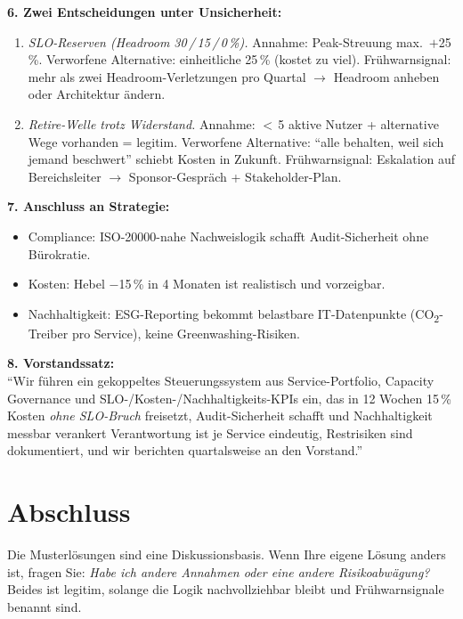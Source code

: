\documentclass[11pt,a4paper,oneside]{article}
\begin{document}
\begin{loesungbox}
\smallskip
\textbf{6. Zwei Entscheidungen unter Unsicherheit:}
\begin{enumerate}
  \item \emph{SLO-Reserven (Headroom 30\,/\,15\,/\,0\,\%).} Annahme: Peak-Streuung max.\ $+$25\,\%. Verworfene Alternative: einheitliche 25\,\% (kostet zu viel). Fr\"uhwarnsignal: mehr als zwei Headroom-Verletzungen pro Quartal $\rightarrow$ Headroom anheben oder Architektur \"andern.
  \item \emph{Retire-Welle trotz Widerstand.} Annahme: $<$\,5 aktive Nutzer + alternative Wege vorhanden = legitim. Verworfene Alternative: ``alle behalten, weil sich jemand beschwert'' \textendash{} schiebt Kosten in Zukunft. Fr\"uhwarnsignal: Eskalation auf Bereichsleiter $\rightarrow$ Sponsor-Gespr\"ach + Stakeholder-Plan.
\end{enumerate}

\smallskip
\textbf{7. Anschluss an Strategie:}
\begin{itemize}
  \item Compliance: ISO-20000-nahe Nachweislogik schafft Audit-Sicherheit ohne B\"urokratie.
  \item Kosten: Hebel $-$15\,\% in 4 Monaten ist realistisch und vorzeigbar.
  \item Nachhaltigkeit: ESG-Reporting bekommt belastbare IT-Datenpunkte (CO\textsubscript{2}-Treiber pro Service), keine Greenwashing-Risiken.
\end{itemize}

\smallskip
\textbf{8. Vorstandssatz:}\\
``Wir f\"uhren ein gekoppeltes Steuerungssystem aus Service-Portfolio, Capacity Governance und SLO-/Kosten-/Nachhaltigkeits-KPIs ein, das in 12 Wochen 15\,\% Kosten \emph{ohne SLO-Bruch} freisetzt, Audit-Sicherheit schafft und Nachhaltigkeit messbar verankert \textendash{} Verantwortung ist je Service eindeutig, Restrisiken sind dokumentiert, und wir berichten quartalsweise an den Vorstand.''
\end{loesungbox}

\clearpage

\section*{Abschluss}
\thispagestyle{plain}

\noindent Die Musterl\"osungen sind eine Diskussionsbasis. Wenn Ihre eigene L\"osung anders ist, fragen Sie: \emph{Habe ich andere Annahmen \textendash{} oder eine andere Risikoabw\"agung?} Beides ist legitim, solange die Logik nachvollziehbar bleibt und Fr\"uhwarnsignale benannt sind.
\end{document}
